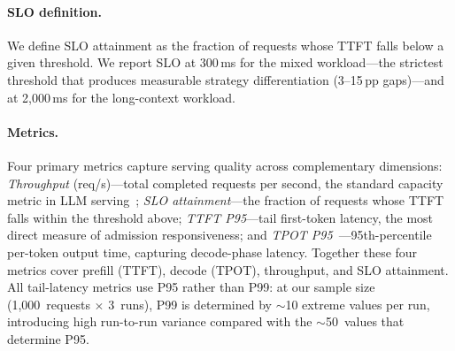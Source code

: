 \documentclass[sigconf,nonacm]{acmart}
\newcommand{\bidkv}{BidKV\xspace}
\newcommand{\qualdelta}{\ensuremath{\delta}}
\begin{document}
\paragraph{SLO definition.}
We define SLO attainment as the fraction of requests whose TTFT falls below
a given threshold.  We report SLO at 300\,ms for the mixed workload---the
strictest threshold that produces measurable strategy differentiation
(3--15\,pp gaps)---and at 2{,}000\,ms for the long-context workload.

\paragraph{Metrics.}
Four primary metrics capture serving quality across complementary dimensions:
\emph{Throughput} (req/s)---total completed requests per second, the standard
capacity metric in LLM serving~\cite{Kwon2023, Yu2022, Zheng2024sglang};
\emph{SLO attainment}---the fraction of requests whose
TTFT falls within the threshold above;
\emph{TTFT P95}---tail first-token latency, the most direct measure of
admission responsiveness;
and \emph{TPOT P95}~\cite{Agrawal2024sarathiserve}---95th-percentile per-token
output time, capturing decode-phase latency.
Together these four metrics cover prefill (TTFT), decode (TPOT), throughput, and
SLO attainment.
All tail-latency metrics use P95 rather than P99: at our sample size
(1{,}000~requests $\times$ 3~runs), P99 is determined by ${\sim}$10 extreme
values per run, introducing high run-to-run variance compared with the
${\sim}$50~values that determine P95.

\end{document}
